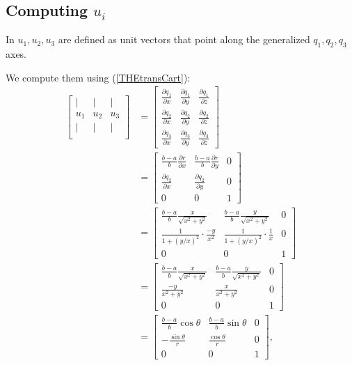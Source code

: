 \documentclass{amsart}
\begin{document}
\subsection{Computing $u_i$}

In \cite{ward96} $u_1,u_2,u_3$ are defined as unit vectors that point along the generalized $q_1,q_2,q_3$ axes.

We compute them using (\ref{THEtransCart}):
\begin{align*}
\begin{bmatrix}
  |  & |  & |\\
  u_1 & u_2 & u_3\\
  |  & |  & |\\
\end{bmatrix}
&=
\begin{bmatrix}
  \frac{\partial q_1}{\partial x} & \frac{\partial q_1}{\partial y} & \frac{\partial q_1}{\partial z}\\
  \frac{\partial q_2}{\partial x} & \frac{\partial q_2}{\partial y} & \frac{\partial q_2}{\partial z}\\
  \frac{\partial q_3}{\partial x} & \frac{\partial q_3}{\partial y} & \frac{\partial q_3}{\partial z}
\end{bmatrix}\\
&=
\begin{bmatrix}
  \frac{b-a}{b}\frac{\partial r}{\partial x} & \frac{b-a}{b}\frac{\partial r}{\partial y} & 0\\
  \frac{\partial q_2}{\partial x}& \frac{\partial q_2}{\partial y} & 0\\
  0 & 0 & 1
\end{bmatrix}\\
&=
\begin{bmatrix}
  \frac{b-a}{b}\frac{x}{\sqrt{x^2+y^2}} & \frac{b-a}{b}\frac{y}{\sqrt{x^2+y^2}} & 0\\
  \frac{1}{1+(y/x)^2}\cdot\frac{-y}{x^2}& \frac{1}{1+(y/x)^2}\cdot\frac{1}{x} & 0\\
  0 & 0 & 1
\end{bmatrix}\\
&=
\begin{bmatrix}
  \frac{b-a}{b}\frac{x}{\sqrt{x^2+y^2}} & \frac{b-a}{b}\frac{y}{\sqrt{x^2+y^2}} & 0\\
  \frac{-y}{x^2+y^2}& \frac{x}{x^2+y^2} & 0\\
  0 & 0 & 1
\end{bmatrix}\\
&=
\begin{bmatrix}
  \frac{b-a}{b}\cos\theta & \frac{b-a}{b}\sin\theta & 0\\
  -\frac{\sin\theta}{r}& \frac{\cos\theta}{r} & 0\\
  0 & 0 & 1
\end{bmatrix},
\end{align*}
\end{document}
